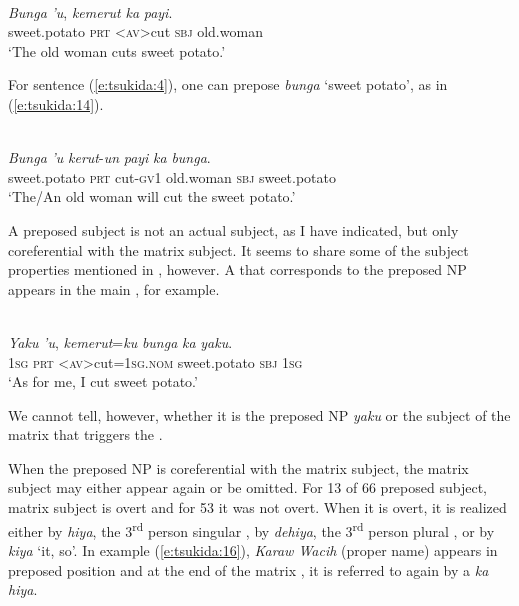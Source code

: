 \documentclass[output=paper
,modfonts
,nonflat]{langsci/langscibook}
\begin{document}
\begin{exe}
	\label{e:tsukida:13}\\
	\gll {\USStar}\textit{Bunga} \textit{'u}, \textit{k}{\USSmaller}\textit{em}{\USGreater}\textit{erut} \textit{ka} \textit{payi}.\\
	\phantom{*}sweet.potato \textsc{prt} <\textsc{av}>cut \textsc{sbj} old.woman\\
	\glt ‘The old woman cuts sweet potato.’
\end{exe}

\noindent
For sentence (\ref{e:tsukida:4}), one can prepose \textit{bunga} ‘sweet potato’, as in (\ref{e:tsukida:14}).

\begin{exe}
	\label{e:tsukida:14}\\
	\gll \textit{Bunga} \textit{'u} \textit{kerut}-\textit{un} \textit{payi} {\USOParen}\textit{ka} \textit{bunga}{\USCParen}.\\
	sweet.potato \textsc{prt} cut-\textsc{gv1} old.woman \phantom{(}\textsc{sbj} sweet.potato\\
	\glt ‘The/An old woman will cut the sweet potato.’
\end{exe}

\noindent
A preposed subject is not an actual subject, as I have indicated, but only coreferential with the matrix subject. It seems to share some of the subject properties mentioned in , however. A   that corresponds to the preposed NP appears in the main , for example.

\begin{exe}
	\label{e:tsukida:15}\\
	\gll \textit{Yaku} \textit{'u}, \textit{k}{\USSmaller}\textit{em}{\USGreater}\textit{erut}=\textit{ku} \textit{bunga}  {\USOParen}\textit{ka}  \textit{yaku}{\USCParen}.\\
	\textsc{1sg} \textsc{prt} <\textsc{av}>cut=\textsc{1sg.nom} sweet.potato \phantom{(}\textsc{sbj} \textsc{1sg}\\
	\glt ‘As for me, I cut sweet potato.’
\end{exe}

\noindent
We cannot tell, however, whether it is the preposed NP \textit{yaku} or the subject of the matrix  that triggers the . 

When the preposed NP is coreferential with the matrix subject, the matrix subject may either appear again or be omitted. For 13 of 66 preposed subject, matrix  subject is overt and for 53 it was not overt. When it is overt, it is realized either by \textit{hiya}, the 3\textsuperscript{rd} person singular , by \textit{dehiya}, the 3\textsuperscript{rd} person plural , or by \textit{kiya} ‘it, so’. In example (\ref{e:tsukida:16}), \textit{Karaw Wacih} (proper name) appears in preposed position and at the end of the matrix , it is referred to again by a  \textit{ka hiya}.
\end{document}
